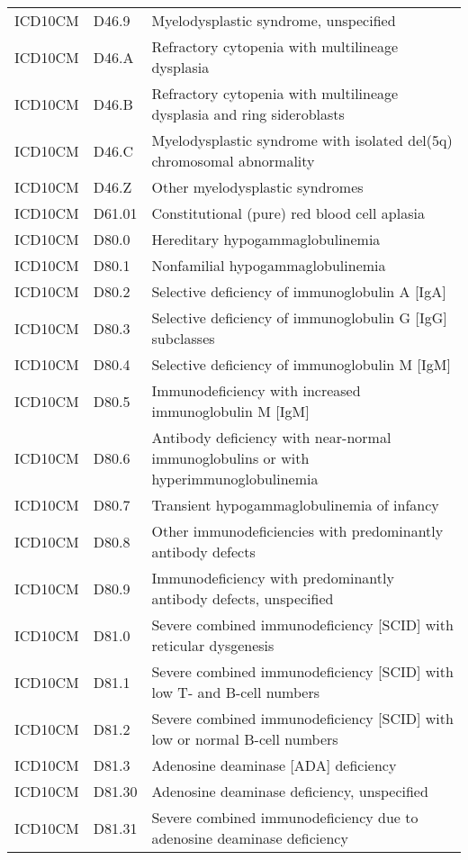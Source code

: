 \begin{longtable}{p{}p{}p{}}
  ICD10CM & D46.9 & Myelodysplastic syndrome, unspecified \\ 
  ICD10CM & D46.A & Refractory cytopenia with multilineage dysplasia \\ 
  ICD10CM & D46.B & Refractory cytopenia with multilineage dysplasia and ring sideroblasts \\ 
  ICD10CM & D46.C & Myelodysplastic syndrome with isolated del(5q) chromosomal abnormality \\ 
  ICD10CM & D46.Z & Other myelodysplastic syndromes \\ 
  ICD10CM & D61.01 & Constitutional (pure) red blood cell aplasia \\ 
  ICD10CM & D80.0 & Hereditary hypogammaglobulinemia \\ 
  ICD10CM & D80.1 & Nonfamilial hypogammaglobulinemia \\ 
  ICD10CM & D80.2 & Selective deficiency of immunoglobulin A [IgA] \\ 
  ICD10CM & D80.3 & Selective deficiency of immunoglobulin G [IgG] subclasses \\ 
  ICD10CM & D80.4 & Selective deficiency of immunoglobulin M [IgM] \\ 
  ICD10CM & D80.5 & Immunodeficiency with increased immunoglobulin M [IgM] \\ 
  ICD10CM & D80.6 & Antibody deficiency with near-normal immunoglobulins or with hyperimmunoglobulinemia \\ 
  ICD10CM & D80.7 & Transient hypogammaglobulinemia of infancy \\ 
  ICD10CM & D80.8 & Other immunodeficiencies with predominantly antibody defects \\ 
  ICD10CM & D80.9 & Immunodeficiency with predominantly antibody defects, unspecified \\ 
  ICD10CM & D81.0 & Severe combined immunodeficiency [SCID] with reticular dysgenesis \\ 
  ICD10CM & D81.1 & Severe combined immunodeficiency [SCID] with low T- and B-cell numbers \\ 
  ICD10CM & D81.2 & Severe combined immunodeficiency [SCID] with low or normal B-cell numbers \\ 
  ICD10CM & D81.3 & Adenosine deaminase [ADA] deficiency \\ 
  ICD10CM & D81.30 & Adenosine deaminase deficiency, unspecified \\ 
  ICD10CM & D81.31 & Severe combined immunodeficiency due to adenosine deaminase deficiency \\ 

\end{longtable}
